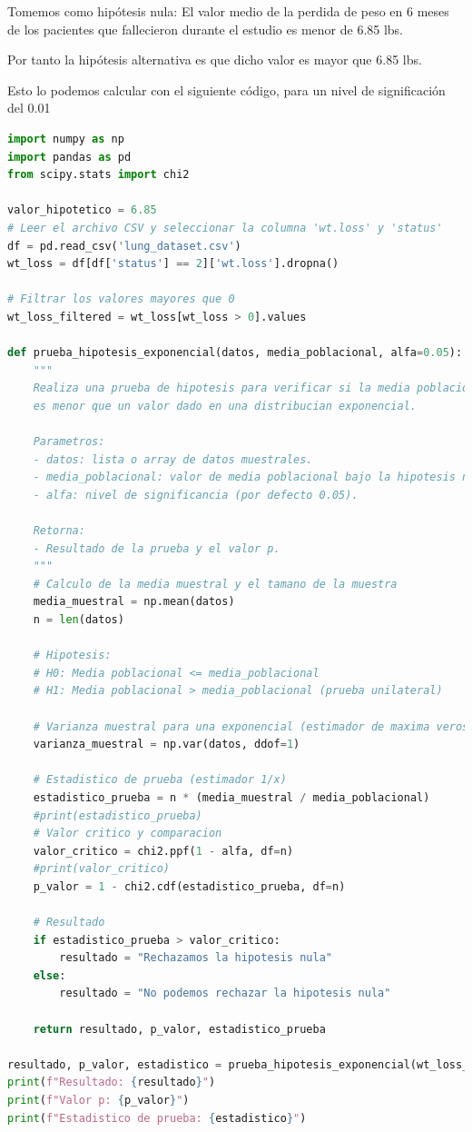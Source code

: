 \documentclass[a4paper,12pt]{article}
\begin{document}
Tomemos como hipótesis nula: El valor medio de la perdida de peso en 6 meses de los pacientes que fallecieron durante el estudio es menor de 6.85 lbs.

Por tanto la hipótesis alternativa es que dicho valor es mayor que 6.85 lbs.

Esto lo podemos calcular con el siguiente código, para un nivel de significación del 0.01

\begin{lstlisting}[language=Python]
import numpy as np
import pandas as pd
from scipy.stats import chi2

valor_hipotetico = 6.85
# Leer el archivo CSV y seleccionar la columna 'wt.loss' y 'status'
df = pd.read_csv('lung_dataset.csv')
wt_loss = df[df['status'] == 2]['wt.loss'].dropna()

# Filtrar los valores mayores que 0
wt_loss_filtered = wt_loss[wt_loss > 0].values

def prueba_hipotesis_exponencial(datos, media_poblacional, alfa=0.05):
    """
    Realiza una prueba de hipotesis para verificar si la media poblacional
    es menor que un valor dado en una distribucian exponencial.

    Parametros:
    - datos: lista o array de datos muestrales.
    - media_poblacional: valor de media poblacional bajo la hipotesis nula.
    - alfa: nivel de significancia (por defecto 0.05).

    Retorna:
    - Resultado de la prueba y el valor p.
    """
    # Calculo de la media muestral y el tamano de la muestra
    media_muestral = np.mean(datos)
    n = len(datos)
    
    # Hipotesis:
    # H0: Media poblacional <= media_poblacional
    # H1: Media poblacional > media_poblacional (prueba unilateral)

    # Varianza muestral para una exponencial (estimador de maxima verosimilitud)
    varianza_muestral = np.var(datos, ddof=1)
    
    # Estadistico de prueba (estimador 1/x)
    estadistico_prueba = n * (media_muestral / media_poblacional)
    #print(estadistico_prueba)
    # Valor critico y comparacion
    valor_critico = chi2.ppf(1 - alfa, df=n)
    #print(valor_critico)
    p_valor = 1 - chi2.cdf(estadistico_prueba, df=n)

    # Resultado
    if estadistico_prueba > valor_critico:
        resultado = "Rechazamos la hipotesis nula"
    else:
        resultado = "No podemos rechazar la hipotesis nula"
    
    return resultado, p_valor, estadistico_prueba

resultado, p_valor, estadistico = prueba_hipotesis_exponencial(wt_loss_filtered, 6.85, 0.01)
print(f"Resultado: {resultado}")
print(f"Valor p: {p_valor}")
print(f"Estadistico de prueba: {estadistico}")

\end{lstlisting}
\end{document}
